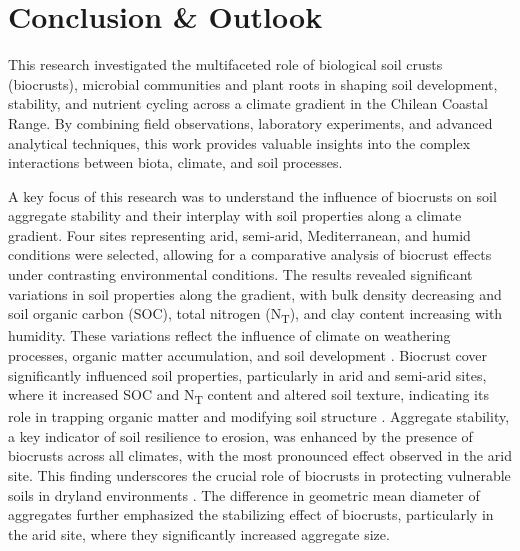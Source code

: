 \chapter{Conclusion \& Outlook}

This research investigated the multifaceted role of biological soil crusts (biocrusts), microbial communities and plant roots in shaping soil development, stability, and nutrient cycling across a climate gradient in the Chilean Coastal Range. By combining field observations, laboratory experiments, and advanced analytical techniques, this work provides valuable insights into the complex interactions between biota, climate, and soil processes.

A key focus of this research was to understand the influence of biocrusts on soil aggregate stability and their interplay with soil properties along a climate gradient. Four sites representing arid, semi-arid, Mediterranean, and humid conditions were selected, allowing for a comparative analysis of biocrust effects under contrasting environmental conditions. The results revealed significant variations in soil properties along the gradient, with bulk density decreasing and soil organic carbon (SOC), total nitrogen (N\textsubscript{T}), and clay content increasing with humidity. These variations reflect the influence of climate on weathering processes, organic matter accumulation, and soil development \citep{Jenny1941}. Biocrust cover significantly influenced soil properties, particularly in arid and semi-arid sites, where it increased SOC and N\textsubscript{T} content and altered soil texture, indicating its role in trapping organic matter and modifying soil structure \citep{Belnap2003,Bowker2006}. Aggregate stability, a key indicator of soil resilience to erosion, was enhanced by the presence of biocrusts across all climates, with the most pronounced effect observed in the arid site. This finding underscores the crucial role of biocrusts in protecting vulnerable soils in dryland environments \citep{Chamizo2012}. The difference in geometric mean diameter of aggregates further emphasized the stabilizing effect of biocrusts, particularly in the arid site, where they significantly increased aggregate size.

